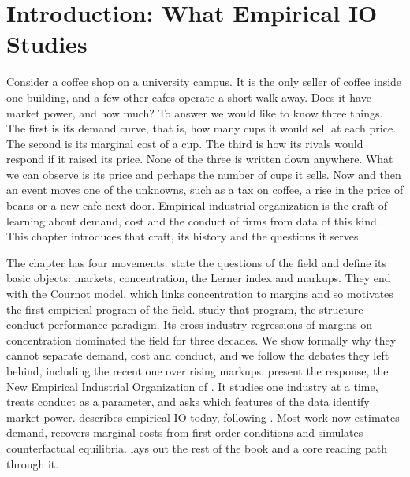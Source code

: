 \chapter{Introduction: What Empirical IO Studies}\label{ch:intro}

Consider a coffee shop on a university campus. It is the only seller of coffee inside one building, and a few
other cafes operate a short walk away. Does it have market power, and how much? To answer we would like to know
three things. The first is its demand curve, that is, how many cups it would sell at each price. The second is its
marginal cost of a cup. The third is how its rivals would respond if it raised its price. None of the three is
written down anywhere. What we can observe is its price and perhaps the number of cups it sells. Now and then an
event moves one of the unknowns, such as a tax on coffee, a rise in the price of beans or a new cafe next door. Empirical industrial organization is the craft of learning about demand, cost and the conduct of
firms from data of this kind. This chapter introduces that craft, its history and the questions it serves.

The chapter has four movements.  state the questions of the field and
define its basic objects: markets, concentration, the Lerner index and markups. They end with the Cournot model,
which links concentration to margins and so motivates the first empirical program of the field.
 study that program, the structure-conduct-performance
paradigm. Its cross-industry regressions of margins on concentration dominated the field for three decades. We
show formally why they cannot separate demand, cost and conduct, and we follow the debates they left behind,
including the recent one over rising markups.  present the response, the
New Empirical Industrial Organization of \citet{Bresnahan1989}. It studies one industry at a time, treats conduct
as a parameter, and asks which features of the data identify market power.  describes empirical
IO today, following \citet{EinavLevin2010}. Most work now estimates demand, recovers marginal costs from
first-order conditions and simulates counterfactual equilibria.  lays out the rest of the book
and a core reading path through it.

